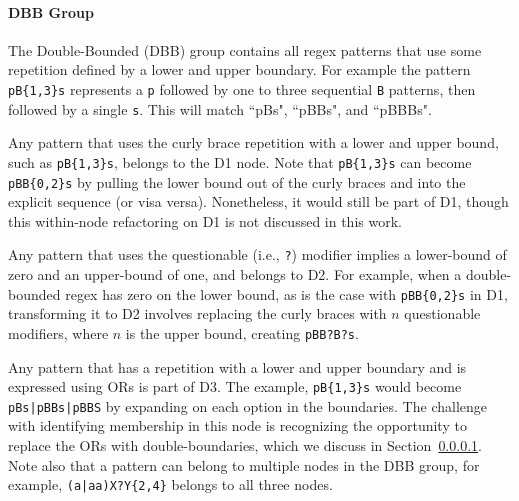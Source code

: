 
\paragraph{DBB Group}
The Double-Bounded (DBB) group contains all regex patterns that use some repetition defined by a lower and upper boundary.  For example the pattern \verb!pB{1,3}s! represents a \verb!p! followed by one to three sequential \verb!B! patterns, then followed by a single \verb!s!.  This will match ``pBs", ``pBBs", and ``pBBBs".

\begin{description}  \itemsep -1pt
\item[D1:] Any pattern that  uses the curly brace repetition with a lower and upper bound, such as  \verb!pB{1,3}s!, belongs to the D1 node.
Note that  \verb!pB{1,3}s! can become \verb!pBB{0,2}s! by pulling the lower bound out of the curly braces and into the explicit sequence (or visa versa). Nonetheless, it would still be part of D1, though this within-node refactoring on D1 is not discussed in this work.
\item[D2:] Any pattern that uses the questionable (i.e., \verb!?!) modifier implies a lower-bound of zero and an upper-bound of one, and belongs to D2. For example, when a double-bounded regex has zero on the lower bound, as is the case with \verb!pBB{0,2}s!  in D1, transforming it to D2 involves replacing the curly braces with $n$ questionable modifiers, where $n$ is the upper bound,  creating \verb!pBB?B?s!.
\item[D3:] Any pattern that has a repetition with a lower and upper boundary and is expressed using ORs is part of D3.  The example, \verb!pB{1,3}s! would become \verb!pBs|pBBs|pBBS! by expanding on each option in the boundaries. The challenge with identifying membership in this node is recognizing the opportunity to replace the ORs with double-boundaries, which we discuss in Section~\ref{}. Note also that a pattern can belong to multiple nodes in the DBB group, for example, \verb!(a|aa)X?Y{2,4}! belongs to all three nodes.

\end{description}

